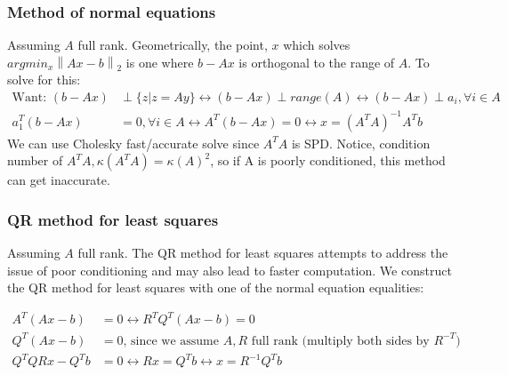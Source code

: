 \documentclass{article}
\newcommand{\norm}[2]{\left\lVert#1\right\rVert_#2}
\begin{document}
\subsubsection{Method of normal equations}
Assuming $A$ full rank. Geometrically, the point, $x$ which solves $argmin_x\norm{Ax - b}{2}$ is one where $b-Ax$ is orthogonal to the range of $A$. To solve for this:
\begin{align*}
    \textrm{Want: } (b-Ax) &\perp \{z \vert z = Ay\} \longleftrightarrow (b-Ax) \perp range(A) \longleftrightarrow (b-Ax) \perp a_i, \forall i \in A\\
    a_1^T(b-Ax) &= 0, \forall i \in A \longleftrightarrow A^T(b-Ax) = 0 \longleftrightarrow x = (A^TA)^{-1}A^Tb
\end{align*}
We can use Cholesky fast/accurate solve since $A^TA$ is SPD. Notice, condition number of $A^TA, \kappa(A^TA) = \kappa(A)^2$, so if A is poorly conditioned, this method can get inaccurate. 

\subsubsection{QR method for least squares}
Assuming $A$ full rank. The QR method for least squares attempts to address the issue of poor conditioning and may also lead to faster computation. We construct the QR method for least squares with one of the normal equation equalities:

\begin{align*}
    A^T(Ax-b) &= 0 \longleftrightarrow R^TQ^T(Ax-b) = 0\\
    Q^T(Ax-b) &= 0 \textrm{, since we assume $A, R$ full rank (multiply both sides by $R^{-T}$})\\
    Q^TQRx-Q^Tb &= 0 \longleftrightarrow Rx = Q^Tb \longleftrightarrow x = R^{-1}Q^Tb
\end{align*}

\end{document}
